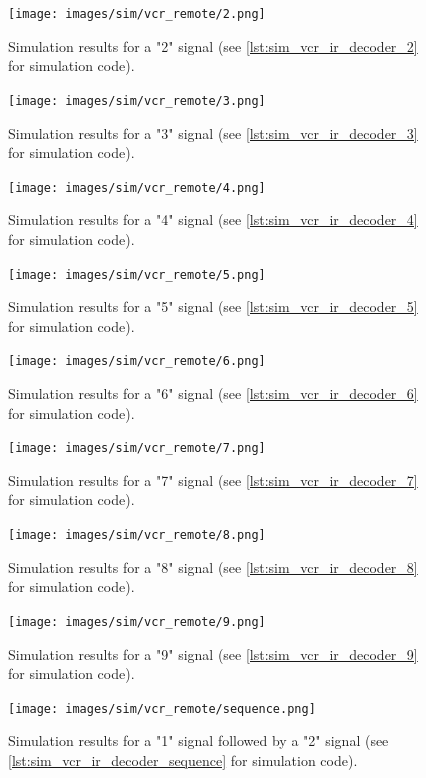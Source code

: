 \documentclass[a4paper]{article}
\begin{document}
\begin{figure}[H]
	\centering
	\texttt{[image: images/sim/vcr\_remote/2.png]}
	\caption{Simulation results for a "2" signal (see \autoref{lst:sim_vcr_ir_decoder_2} for simulation code).}
\end{figure}

\begin{figure}[H]
	\centering
	\texttt{[image: images/sim/vcr\_remote/3.png]}
	\caption{Simulation results for a "3" signal (see \autoref{lst:sim_vcr_ir_decoder_3} for simulation code).}
\end{figure}

\begin{figure}[H]
	\centering
	\texttt{[image: images/sim/vcr\_remote/4.png]}
	\caption{Simulation results for a "4" signal (see \autoref{lst:sim_vcr_ir_decoder_4} for simulation code).}
\end{figure}

\begin{figure}[H]
	\centering
	\texttt{[image: images/sim/vcr\_remote/5.png]}
	\caption{Simulation results for a "5" signal (see \autoref{lst:sim_vcr_ir_decoder_5} for simulation code).}
\end{figure}

\begin{figure}[H]
	\centering
	\texttt{[image: images/sim/vcr\_remote/6.png]}
	\caption{Simulation results for a "6" signal (see \autoref{lst:sim_vcr_ir_decoder_6} for simulation code).}
\end{figure}

\begin{figure}[H]
	\centering
	\texttt{[image: images/sim/vcr\_remote/7.png]}
	\caption{Simulation results for a "7" signal (see \autoref{lst:sim_vcr_ir_decoder_7} for simulation code).}
\end{figure}

\begin{figure}[H]
	\centering
	\texttt{[image: images/sim/vcr\_remote/8.png]}
	\caption{Simulation results for a "8" signal (see \autoref{lst:sim_vcr_ir_decoder_8} for simulation code).}
\end{figure}

\begin{figure}[H]
	\centering
	\texttt{[image: images/sim/vcr\_remote/9.png]}
	\caption{Simulation results for a "9" signal (see \autoref{lst:sim_vcr_ir_decoder_9} for simulation code).}
\end{figure}

\begin{figure}[H]
	\centering
	\texttt{[image: images/sim/vcr\_remote/sequence.png]}
	\caption{Simulation results for a "1" signal followed by a "2" signal (see \autoref{lst:sim_vcr_ir_decoder_sequence} for simulation code).}
\end{figure}
\end{document}
